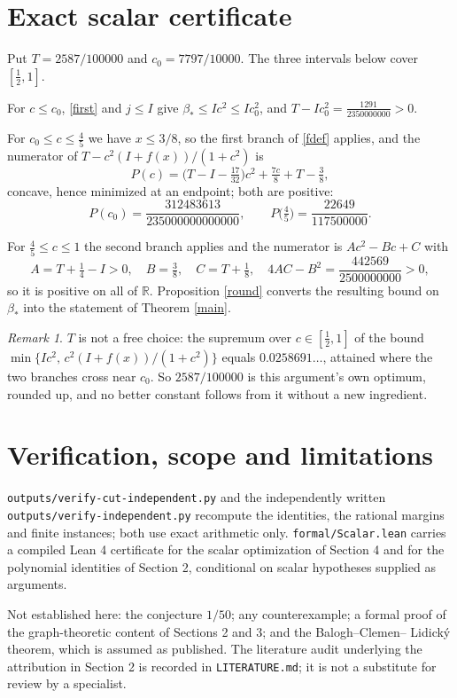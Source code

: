 \documentclass[11pt]{article}
\theoremstyle{remark}
\newtheorem{remark}{Remark}
\newcommand{\bh}{\beta_*}
\begin{document}
\section{Exact scalar certificate}
Put $T=2587/100000$ and $c_0=7797/10000$. The three intervals below cover
$[\frac12,1]$.

For $c\le c_0$, \eqref{first} and $j\le I$ give
$\bh\le Ic^2\le Ic_0^2$, and
$T-Ic_0^2=\frac{1291}{2350000000}>0$.

For $c_0\le c\le\frac45$ we have $x\le3/8$, so the first branch of
\eqref{fdef} applies, and the numerator of $T-c^2(I+f(x))/(1+c^2)$ is
\[
 P(c)=\Big(T-I-\tfrac{17}{32}\Big)c^2+\tfrac{7c}{8}+T-\tfrac38 ,
\]
concave, hence minimized at an endpoint; both are positive:
\[
 P(c_0)=\frac{312483613}{235000000000000},\qquad
 P\big(\tfrac45\big)=\frac{22649}{117500000}.
\]

For $\frac45\le c\le1$ the second branch applies and the numerator is
$Ac^2-Bc+C$ with
\[
 A=T+\tfrac14-I>0,\quad B=\tfrac38,\quad C=T+\tfrac18,\quad
 4AC-B^2=\frac{442569}{2500000000}>0,
\]
so it is positive on all of $\mathbb R$. Proposition \ref{round} converts the
resulting bound on $\bh$ into the statement of Theorem \ref{main}.

\begin{remark}
$T$ is not a free choice: the supremum over $c\in[\frac12,1]$ of the bound
$\min\{Ic^2,\,c^2(I+f(x))/(1+c^2)\}$ equals $0.0258691\ldots$, attained where
the two branches cross near $c_0$. So $2587/100000$ is this argument's own
optimum, rounded up, and no better constant follows from it without a new
ingredient.
\end{remark}

\section{Verification, scope and limitations}
\texttt{outputs/verify-cut-independent.py} and the independently written
\texttt{outputs/verify-independent.py} recompute the identities, the rational
margins and finite instances; both use exact arithmetic only.
\texttt{formal/Scalar.lean} carries a compiled Lean 4 certificate for the
scalar optimization of Section 4 and for the polynomial identities of
Section 2, conditional on scalar hypotheses supplied as arguments.

Not established here: the conjecture $1/50$; any counterexample; a formal proof
of the graph-theoretic content of Sections 2 and 3; and the Balogh--Clemen--%
Lidick\'y theorem, which is assumed as published. The literature audit
underlying the attribution in Section 2 is recorded in \texttt{LITERATURE.md};
it is not a substitute for review by a specialist.
\end{document}
